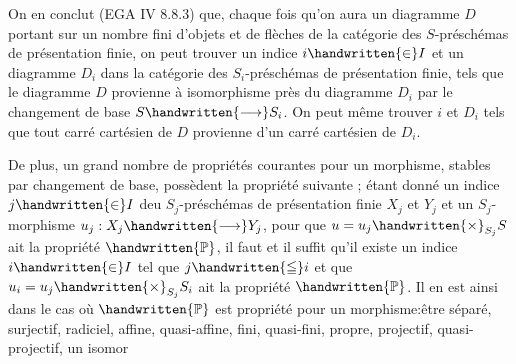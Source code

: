 On en conclut (EGA IV 8.8.3) que, chaque fois qu'on aura un diagramme $D$ portant sur un nombre fini d'objets et de flèches de la catégorie des $S$-préschémas de présentation finie, on peut trouver un indice $i\handwritten{\in}I$ et un diagramme $D_i$ dans la catégorie des $S_i$-préschémas de présentation finie, tels que le diagramme $D$ provienne à isomorphisme près du diagramme $D_i$ par le changement de base $S\handwritten{\longrightarrow}S_i$. On peut même trouver $i$ et $D_i$ tels que tout carré cartésien de $D$ provienne d'un carré cartésien de $D_i$.

 De plus, un grand nombre de propriétés  courantes pour un morphisme, stables par changement de base, possèdent la propriété suivante ; étant donné un indice $j\handwritten{\in}I$ deu $S_j$-préschémas de présentation finie $X_j$ et $Y_j$ et un $S_j$-morphisme $u_j:X_j\handwritten{\longrightarrow}Y_j$, pour que $u=u_j\handwritten{\times}_{S_j}S$ ait la propriété $\handwritten{\mathbb{P}}$, il faut et il suffit qu'il existe un indice $i\handwritten{\in}I$ tel que $j\handwritten{\leqq}i$ et que $u_i=u_j\handwritten{\times}_{S_j}S_i$ ait la propriété $\handwritten{\mathbb{P}}$. Il en est ainsi dans le cas où $\handwritten{\mathbb{P}}$ est  propriété pour un morphisme:être séparé, surjectif, radiciel, affine, quasi-affine, fini, quasi-fini, propre, projectif, quasi-projectif, un isomor%
